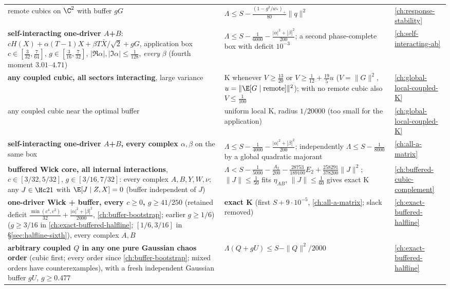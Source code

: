 \begin{center}
\begin{tabular}{p{6.2cm}p{4.6cm}p{2.6cm}}
remote cubics on $\C^2$ with buffer $gG$ & $\Lambda\le S-\tfrac{(1-g^2/w_*)_+}{80}\|q\|^2$ & \autoref{ch:response-stability}\\
\textbf{self-interacting one-driver $A$+$B$}: $cH(X)+\alpha(T-1)X+\beta T\bar X/\sqrt2+gG$, application box $c\in[\frac3{32},\frac7{64}]$, $g\in[\frac3{16},\frac7{32}]$, $|\Re\alpha|,|\Im\alpha|\le\frac1{128}$, \emph{every} $\beta$ (fourth moment $3.01$--$4.71$) & $\Lambda\le S-\tfrac1{6000}-\tfrac{|\alpha|^2+|\beta|^2}{200}$; a second phase-complete box with deficit $10^{-3}$ & \autoref{ch:self-interacting-ab}\\
\textbf{any coupled cubic, all sectors interacting}, large variance & K whenever $V\ge\tfrac{13}{20}$ or $V\ge\tfrac1{12}+\tfrac{19}5u$ ($V=\|G\|^2$, $u=\|\E[G\mid\text{remote}]\|^2$); with no remote cubic also $V\le\tfrac1{100}$ & \autoref{ch:global-local-coupled-K}\\
any coupled cubic near the optimal buffer & uniform local K, radius $1/20000$ (too small for the application) & \autoref{ch:global-local-coupled-K}\\
\textbf{self-interacting one-driver $A$+$B$, every complex $\alpha,\beta$} on the same box & $\Lambda\le S-\tfrac1{4000}-\tfrac{|\alpha|^2+|\beta|^2}{200}$; independently $\Lambda\le S-\tfrac1{8000}$ by a global quadratic majorant & \autoref{ch:all-a-matrix}\\
\textbf{buffered Wick core, all internal interactions}, $c\in[3/32,5/32]$, $g\in[3/16,7/32]$: every complex $A,B,Y,W,\nu$; any $J\in\Hc21$ with $\E[J\mid Z,X]=0$ (buffer independent of $J$) & $\Lambda<S-\tfrac1{5000}-\tfrac{A_2}{200}-\tfrac{28753}{189100}E_2+\tfrac{258291}{378200}\|J\|^2$; $\|J\|\le\tfrac1{50}$ fits $\eta_{AB}$, $\|J\|\le\tfrac1{60}$ gives exact K & \autoref{ch:buffered-cubic-complement}\\
\textbf{one-driver Wick + buffer, every $c\ge0$, $g\ge41/250$} (retained deficit $\frac{\min(c^4,c^2)}{32}+\frac{|\alpha|^2+|\beta|^2}{2000}$, \autoref{ch:buffer-bootstrap}; earlier $g\ge1/6$) ($g\ge3/16$ in \autoref{ch:exact-buffered-halfline}; $[1/6,3/16]$ in \S\ref{sec:halfline-sixth}), every complex $A,B$ & \textbf{exact K} (first $S+9\cdot10^{-5}$, \autoref{ch:all-a-matrix}; slack removed) & \autoref{ch:exact-buffered-halfline}\\
\textbf{arbitrary coupled $Q$ in any one pure Gaussian chaos order} (cubic first; every order since \autoref{ch:buffer-bootstrap}; mixed orders have counterexamples), with a fresh independent Gaussian buffer $gU$, $g\ge0.477$ & $\Lambda(Q+gU)\le S-\|Q\|^2/2000$ & \autoref{ch:exact-buffered-halfline}\\

\end{tabular}
\end{center}
